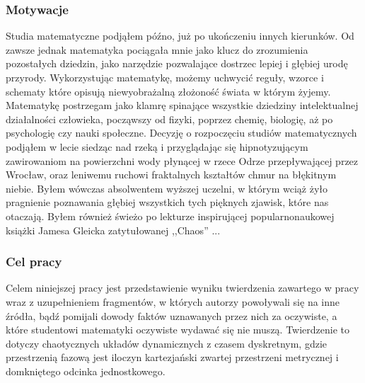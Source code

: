 \documentclass[licencjacka]{pwr_wmat_praca_dyplomowa}
\theoremstyle{plain}
\numberwithin{theorem}{chapter}
\theoremstyle{definition}
\numberwithin{theorem}{chapter}
\begin{document}
\subsubsection{Motywacje}
Studia matematyczne podjąłem późno, już po ukończeniu innych kierunków. Od zawsze jednak matematyka pociągała mnie jako klucz do zrozumienia pozostałych dziedzin, jako narzędzie pozwalające dostrzec lepiej i głębiej urodę przyrody. Wykorzystując matematykę, możemy uchwycić reguły, wzorce i schematy które opisują niewyobrażalną złożoność świata w którym żyjemy. Matematykę postrzegam jako klamrę spinające wszystkie dziedziny intelektualnej działalności człowieka, począwszy od fizyki, poprzez chemię, biologię, aż po psychologię czy nauki społeczne. Decyzję o rozpoczęciu studiów matematycznych podjąłem w lecie siedząc nad rzeką i przyglądając się hipnotyzującym zawirowaniom na powierzchni wody płynącej w rzece Odrze przepływającej przez Wrocław, oraz leniwemu ruchowi fraktalnych kształtów chmur na błękitnym niebie. Byłem wówczas absolwentem wyższej uczelni, w którym wciąż żyło pragnienie poznawania głębiej wszystkich tych pięknych zjawisk, które nas otaczają. Byłem również świeżo po lekturze inspirującej popularnonaukowej książki Jamesa Gleicka zatytułowanej ,,Chaos'' \cite{gleick1987chaos}...

\subsubsection{Cel pracy}
Celem niniejszej pracy jest przedstawienie wyniku twierdzenia zawartego w pracy \cite{balibrea2003topological} wraz z uzupełnieniem fragmentów, w których autorzy powoływali się na inne źródła, bądź pomijali dowody faktów uznawanych przez nich za oczywiste, a które studentowi matematyki oczywiste wydawać się nie muszą. Twierdzenie to dotyczy chaotycznych układów dynamicznych z czasem dyskretnym, gdzie przestrzenią fazową jest iloczyn kartezjański zwartej przestrzeni metrycznej i domkniętego odcinka jednostkowego.
\end{document}
